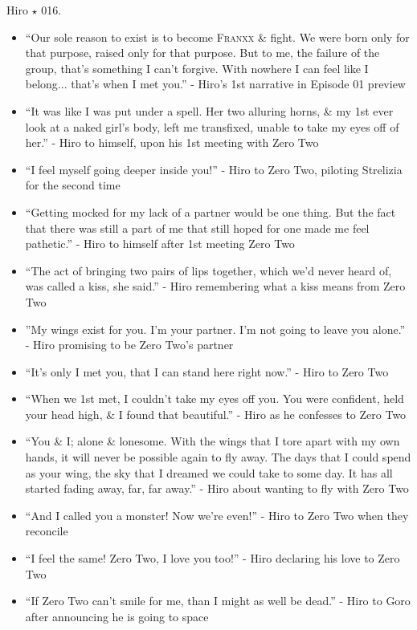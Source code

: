 \documentclass{article}
\begin{document}
\begin{enumerate}
    {\sc Hiro $\star$ 016.}
    \begin{itemize}
    	\item ``Our sole reason to exist is to become \textsc{Franxx} \& fight. We were born only for that purpose, raised only for that purpose. But to me, the failure of the group, that's something I can't forgive. With nowhere I can feel like I belong... that's when I met you.'' - Hiro's 1st narrative in Episode 01 preview
    	\item ``It was like I was put under a spell. Her two alluring horns, \& my 1st ever look at a naked girl's body, left me transfixed, unable to take my eyes off of her.'' - Hiro to himself, upon his 1st meeting with Zero Two
    	\item ``I feel myself going deeper inside you!'' - Hiro to Zero Two, piloting Strelizia for the second time 
    	\item ``Getting mocked for my lack of a partner would be one thing. But the fact that there was still a part of me that still hoped for one made me feel pathetic.'' - Hiro to himself after 1st meeting Zero Two
    	\item ``The act of bringing two pairs of lips together, which we'd never heard of, was called a kiss, she said.'' - Hiro remembering what a kiss means from Zero Two
    	\item  ''My wings exist for you. I'm your partner. I'm not going to leave you alone.'' - Hiro promising to be Zero Two's partner
    	\item ``It's only I met you, that I can stand here right now.'' - Hiro to Zero Two
    	\item ``When we 1st met, I couldn't take my eyes off you. You were confident, held your head high, \& I found that beautiful.'' - Hiro as he confesses to Zero Two
    	\item ``You \& I; alone \& lonesome. With the wings that I tore apart with my own hands, it will never be possible again to fly away. The days that I could spend as your wing, the sky that I dreamed we could take to some day. It has all started fading away, far, far away.'' - Hiro about wanting to fly with Zero Two
    	\item ``And I called you a monster! Now we're even!'' - Hiro to Zero Two when they reconcile
    	\item ``I feel the same! Zero Two, I love you too!'' - Hiro declaring his love to Zero Two
    	\item ``If Zero Two can't smile for me, than I might as well be dead.'' - Hiro to Goro after announcing he is going to space 

\end{itemize}
\end{enumerate}
\end{document}
